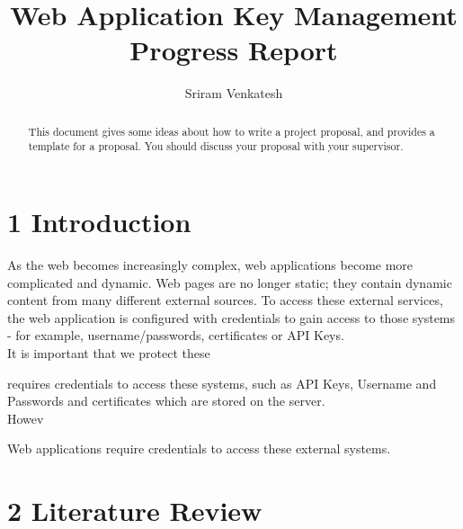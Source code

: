 \documentclass[11pt, a4paper, twoside, openright]{report}
\title{Web Application Key Management Progress Report}
\author{Sriram Venkatesh}
\date{}
\begin{document}
\frontmatter


\begin{abstract}
  This document gives some ideas about how to write a project
  proposal, and provides a template for a proposal. You should discuss
  your proposal with your supervisor.
\end{abstract}


\maketitle




\mainmatter


\section*{1 Introduction}
As the web becomes increasingly complex, web applications become more complicated and dynamic. Web pages are no longer static; they contain dynamic content from many different external sources. To access these external services, the web application is configured with credentials to gain access to those systems - for example, username/passwords, certificates or API Keys. \\

It is important that we protect these 


requires credentials to access these systems, such as API Keys, Username and Passwords and certificates which are stored on the server. \\

Howev


Web applications require credentials to access these external systems.  








\section*{2 Literature Review}
\end{document}
